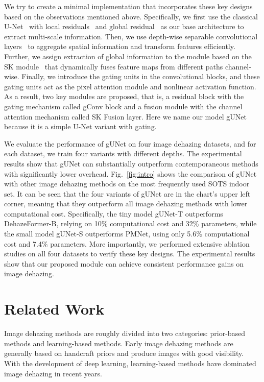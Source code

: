 \documentclass[10pt,twocolumn,letterpaper]{article}
\begin{document}
We try to create a minimal implementation that incorporates these key designs based on the observations mentioned above.
Specifically, we first use the classical U-Net~\cite{long2015fully} with local residuals~\cite{he2016deep} and global residual~\cite{zhang2017beyond} as our base architecture to extract multi-scale information.
Then, we use depth-wise separable convolutional layers~\cite{howard2017mobilenets,sandler2018mobilenetv2} to aggregate spatial information and transform features efficiently.
Further, we assign extraction of global information to the module based on the SK module~\cite{li2019selective} that dynamically fuses feature maps from different paths channel-wise.
Finally, we introduce the gating units in the convolutional blocks, and these gating units act as the pixel attention module and nonlinear activation function.
As a result, two key modules are proposed, that is, a residual block with the gating mechanism called gConv block and a fusion module with the channel attention mechanism called SK Fusion layer.
Here we name our model gUNet because it is a simple U-Net variant with gating.

We evaluate the performance of gUNet on four image dehazing datasets, and for each dataset, we train four variants with different depths.
The experimental results show that gUNet can substantially outperform contemporaneous methods with significantly lower overhead.
Fig.~\ref{fig:intro} shows the comparison of gUNet with other image dehazing methods on the most frequently used SOTS indoor set.
It can be seen that the four variants of gUNet are in the chart's upper left corner, meaning that they outperform all image dehazing methods with lower computational cost.
Specifically, the tiny model gUNet-T outperforms DehazeFormer-B, relying on 10\% computational cost and 32\% parameters, while the small model gUNet-S outperforms PMNet, using only 5.6\% computational cost and 7.4\% parameters.
More importantly, we performed extensive ablation studies on all four datasets to verify these key designs. 
The experimental results show that our proposed module can achieve consistent performance gains on image dehazing.
 \section{Related Work}

Image dehazing methods are roughly divided into two categories: prior-based methods and learning-based methods.
Early image dehazing methods are generally based on handcraft priors and produce images with good visibility.
With the development of deep learning, learning-based methods have dominated image dehazing in recent years.
\end{document}
